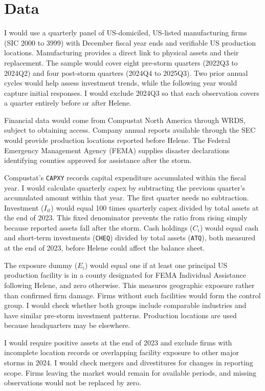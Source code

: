 \section*{Data}

I would use a quarterly panel of US-domiciled, US-listed manufacturing firms (SIC 2000 to 3999) with December fiscal year ends and verifiable US production locations. Manufacturing provides a direct link to physical assets and their replacement. The sample would cover eight pre-storm quarters (2022Q3 to 2024Q2) and four post-storm quarters (2024Q4 to 2025Q3). Two prior annual cycles would help assess investment trends, while the following year would capture initial responses. I would exclude 2024Q3 so that each observation covers a quarter entirely before or after Helene.

Financial data would come from Compustat North America through WRDS, subject to obtaining access. Company annual reports available through the SEC would provide production locations reported before Helene. The Federal Emergency Management Agency (FEMA) supplies disaster declarations identifying counties approved for assistance after the storm.

Compustat's \texttt{CAPXY} records capital expenditure accumulated within the fiscal year. I would calculate quarterly capex by subtracting the previous quarter's accumulated amount within that year. The first quarter needs no subtraction. Investment ($I_{it}$) would equal 100 times quarterly capex divided by total assets at the end of 2023. This fixed denominator prevents the ratio from rising simply because reported assets fall after the storm. Cash holdings ($C_i$) would equal cash and short-term investments (\texttt{CHEQ}) divided by total assets (\texttt{ATQ}), both measured at the end of 2023, before Helene could affect the balance sheet.

The exposure dummy ($E_i$) would equal one if at least one principal US production facility is in a county designated for FEMA Individual Assistance following Helene, and zero otherwise. This measures geographic exposure rather than confirmed firm damage. Firms without such facilities would form the control group. I would check whether both groups include comparable industries and have similar pre-storm investment patterns. Production locations are used because headquarters may be elsewhere.

I would require positive assets at the end of 2023 and exclude firms with incomplete location records or overlapping facility exposure to other major storms in 2024. I would check mergers and divestitures for changes in reporting scope. Firms leaving the market would remain for available periods, and missing observations would not be replaced by zero.
